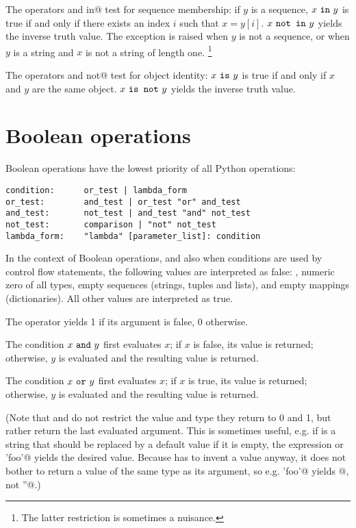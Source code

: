 The operators \verb@in@ and \verb@not in@ test for sequence
membership: if $y$ is a sequence, $x ~\verb@in@~ y$ is true if and
only if there exists an index $i$ such that $x = y[i]$.
$x ~\verb@not in@~ y$ yields the inverse truth value.  The exception
\verb@TypeError@ is raised when $y$ is not a sequence, or when $y$ is
a string and $x$ is not a string of length one.%
\footnote{The latter restriction is sometimes a nuisance.}

The operators \verb@is@ and \verb@is not@ test for object identity:
$x ~\verb@is@~ y$ is true if and only if $x$ and $y$ are the same
object.  $x ~\verb@is not@~ y$ yields the inverse truth value.

\section{Boolean operations} \label{Booleans}

Boolean operations have the lowest priority of all Python operations:

\begin{verbatim}
condition:      or_test | lambda_form
or_test:        and_test | or_test "or" and_test
and_test:       not_test | and_test "and" not_test
not_test:       comparison | "not" not_test
lambda_form:	"lambda" [parameter_list]: condition
\end{verbatim}

In the context of Boolean operations, and also when conditions are
used by control flow statements, the following values are interpreted
as false: \verb@None@, numeric zero of all types, empty sequences
(strings, tuples and lists), and empty mappings (dictionaries).  All
other values are interpreted as true.

The operator \verb@not@ yields 1 if its argument is false, 0 otherwise.

The condition $x ~\verb@and@~ y$ first evaluates $x$; if $x$ is false,
its value is returned; otherwise, $y$ is evaluated and the resulting
value is returned.

The condition $x ~\verb@or@~ y$ first evaluates $x$; if $x$ is true,
its value is returned; otherwise, $y$ is evaluated and the resulting
value is returned.

(Note that \verb@and@ and \verb@or@ do not restrict the value and type
they return to 0 and 1, but rather return the last evaluated argument.
This is sometimes useful, e.g. if \verb@s@ is a string that should be
replaced by a default value if it is empty, the expression
\verb@s or 'foo'@ yields the desired value.  Because \verb@not@ has to
invent a value anyway, it does not bother to return a value of the
same type as its argument, so e.g. \verb@not 'foo'@ yields @,
not \verb@''@.)

